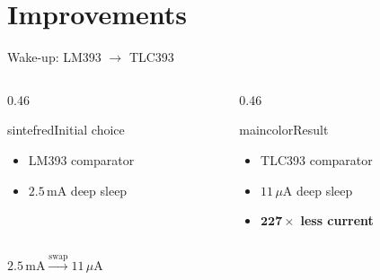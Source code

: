 \section{Improvements}

\begin{frame}{Wake-up: LM393 $\rightarrow$ TLC393}
\begin{columns}[T,onlytextwidth]
\begin{column}{0.46\textwidth}
  \begin{colorblock}[white]{sintefred}{Initial choice}
  \large
  \begin{itemize}
    \item LM393 comparator
    \item $2.5$\,mA deep sleep
  \end{itemize}
  \end{colorblock}
\end{column}
\begin{column}{0.46\textwidth}
  \begin{colorblock}[white]{maincolor}{Result}
  \large
  \begin{itemize}
    \item TLC393 comparator
    \item $11\,\mu$A deep sleep
    \item $\mathbf{227\times}$ \textbf{less current}
  \end{itemize}
  \end{colorblock}
\end{column}
\end{columns}
\vspace{0.5cm}
\centering
{\Large $2.5\,\text{mA} \xrightarrow{\text{swap}} 11\,\mu\text{A}$}
\end{frame}

